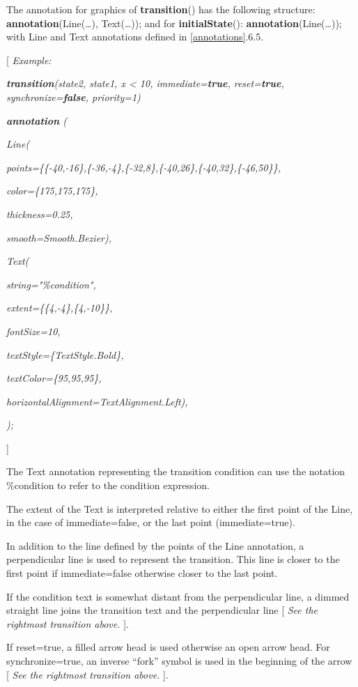 \documentclass[10pt,a4paper]{report}
\begin{document}
The annotation for graphics of \textbf{transition}() has the following
structure: \textbf{annotation}(Line(\ldots{}), Text(\ldots{})); and for
\textbf{initialState}(): \textbf{annotation}(Line(\ldots{})); with Line
and Text annotations defined in \ref{annotations}.6.5.

{[} \emph{Example:}

\emph{\textbf{transition}(state2, state1, x \textless{} 10,
immediate=\textbf{true}, reset=\textbf{true},
synchronize=\textbf{false}, priority=1) }

\emph{\textbf{annotation} (}

\emph{Line(}

\emph{points=\{\{-40,-16\},\{-36,-4\},\{-32,8\},\{-40,26\},\{-40,32\},\{-46,50\}\},}

\emph{color=\{175,175,175\},}

\emph{thickness=0.25,}

\emph{smooth=Smooth.Bezier),}

\emph{Text(}

\emph{string="\%condition",}

\emph{extent=\{\{4,-4\},\{4,-10\}\}, }

\emph{fontSize=10,}

\emph{textStyle=\{TextStyle.Bold\},}

\emph{textColor=\{95,95,95\},}

\emph{horizontalAlignment=TextAlignment.Left),}

\emph{);}

{]}

The Text annotation representing the transition condition can use the
notation \%condition to refer to the condition expression.

The extent of the Text is interpreted relative to either the first point
of the Line, in the case of immediate=false, or the last point
(immediate=true).

In addition to the line defined by the points of the Line annotation, a
perpendicular line is used to represent the transition. This line is
closer to the first point if immediate=false otherwise closer to the
last point.

If the condition text is somewhat distant from the perpendicular line, a
dimmed straight line joins the transition text and the perpendicular
line {[} \emph{See the rightmost transition above.} {]}.

If reset=true, a filled arrow head is used otherwise an open arrow head.
For synchronize=true, an inverse ``fork'' symbol is used in the
beginning of the arrow {[} \emph{See the rightmost transition above.}
{]}.
\end{document}
